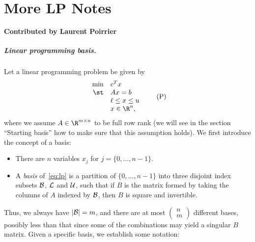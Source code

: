\chapter{More LP Notes}
\textbf{Contributed by Laurent Poirrier}

\paragraph{Linear programming basis.}

Let a linear programming problem be given by
\begin{equation}
\begin{array}{rl}
\min & c^T x \\
\st  & A x = b \\
     & \ell \leq x \leq u \\
     & x \in \R^n,
\end{array}
\tag{P}
\label{eq:lp}
\end{equation}
where we assume $A \in \R^{m \times n}$ to be full row rank
(we will see in the section ``Starting basis'' how to make
sure that this assumption holds).
We first introduce the concept of a basis:
\begin{itemize}
\item There are $n$ variables $x_j$ for $j = \{ 0, \ldots, n-1 \}$.
\item A \emph{basis} of~\eqref{eq:lp} is a partition of
$\{ 0, \ldots, n-1 \}$ into three disjoint index subsets
$\mathcal{B}$, $\mathcal{L}$ and $\mathcal{U}$, such that
if $B$ is the matrix formed by taking
the columns of $A$ indexed by $\mathcal{B}$, then $B$ is square and
invertible.
\end{itemize}
Thus, we always have $|\mathcal{B}| = m$, and there are at most
$\left( \begin{smallmatrix} n \\ m \end{smallmatrix} \right)$ different
bases, possibly less than that since some of the combinations
may yield a singular $B$ matrix.
Given a specific basis, we establish some notation: 
